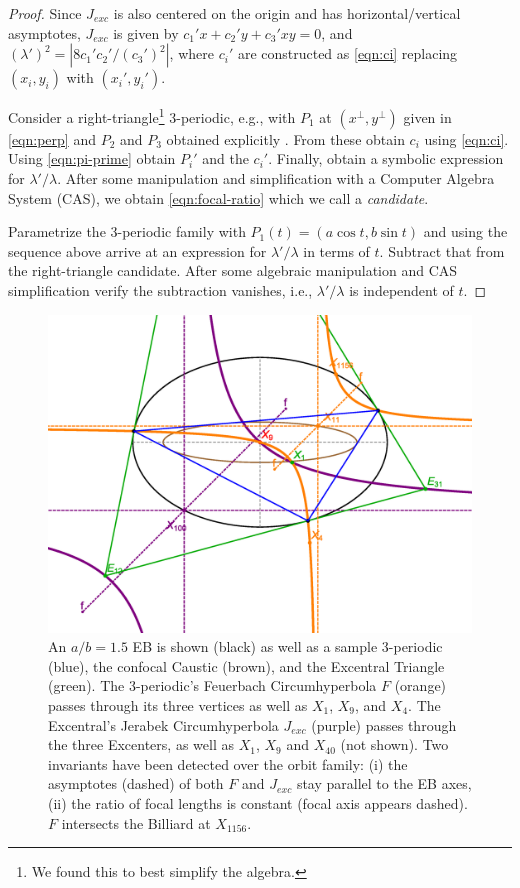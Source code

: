 \begin{proof}
Since $J_{exc}$ is also centered on the origin and has horizontal/vertical asymptotes, $J_{exc}$ is given by $c_1'x+c_2'y+c_3'x y=0$, and $(\lambda')^2=|8c_1'c_2'/(c_3')^2|$, where $c_i'$ are constructed as \eqref{eqn:ci} replacing $(x_i,y_i)$ with $(x_i',y_i')$.

Consider a right-triangle\footnote{We found this to best simplify the algebra.} 3-periodic, e.g., with $P_1$ at $(x^\perp,y^\perp)$ given in \eqref{eqn:perp} and $P_2$ and $P_3$ obtained explicitly \cite{garcia2019-incenter}. From these obtain $c_i$ using \eqref{eqn:ci}. Using \eqref{eqn:pi-prime} obtain $P_i'$ and the $c_i'$. Finally, obtain a symbolic expression for $\lambda'/\lambda$. After some manipulation and simplification with a Computer Algebra System (CAS), we obtain \eqref{eqn:focal-ratio} which we call a {\em candidate}.

Parametrize the 3-periodic family with $P_1(t)=(a\cos{t},b\sin{t})$ and using the sequence above arrive at an expression for $\lambda'/\lambda$ in terms of $t$. Subtract that from the right-triangle candidate. After some algebraic manipulation and CAS simplification verify the subtraction vanishes, i.e., $\lambda'/\lambda$ is independent of $t$.
\end{proof}

\begin{figure}
    \centering
    \includegraphics[width=\textwidth]{pics_eps_new/0060_circumhyps.eps}
    \caption{An $a/b=1.5$ EB is shown (black) as well as a sample 3-periodic (blue), the confocal Caustic (brown), and the Excentral Triangle (green). The 3-periodic's Feuerbach Circumhyperbola $F$ (orange) passes through its three vertices as well as $X_1$, $X_9$, and $X_4$. The Excentral's Jerabek Circumhyperbola $J_{exc}$ (purple) passes through the three Excenters, as well as $X_1$, $X_9$ and $X_{40}$ (not shown). Two invariants have been detected over the orbit family: (i) the asymptotes (dashed) of both $F$ and $J_{exc}$ stay parallel to the EB axes, (ii) the ratio of focal lengths is constant (focal axis appears dashed). $F$ intersects the Billiard at $X_{1156}$.}
    \label{fig:circumhyps}
\end{figure}

